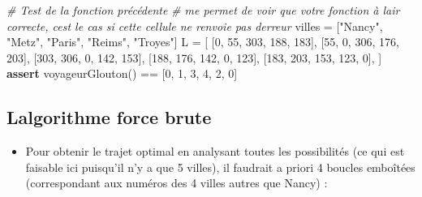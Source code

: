 \documentclass[
  paper=a4,
  ,captions=tableheading
]{scrartcl}
\newenvironment{Shaded}{}{}
\newcommand{\CommentTok}[1]{\textcolor[rgb]{0.38,0.63,0.69}{\textit{#1}}}
\newcommand{\ControlFlowTok}[1]{\textcolor[rgb]{0.00,0.44,0.13}{\textbf{#1}}}
\newcommand{\DecValTok}[1]{\textcolor[rgb]{0.25,0.63,0.44}{#1}}
\newcommand{\NormalTok}[1]{#1}
\newcommand{\OperatorTok}[1]{\textcolor[rgb]{0.40,0.40,0.40}{#1}}
\newcommand{\StringTok}[1]{\textcolor[rgb]{0.25,0.44,0.63}{#1}}
\providecommand{\tightlist}{%
  \setlength{\itemsep}{0pt}\setlength{\parskip}{0pt}}
\begin{document}
\begin{Shaded}
\begin{Highlighting}[]
\CommentTok{\# Test de la fonction précédente}
\CommentTok{\# me permet de voir que votre fonction à l\textquotesingle{}air correcte, c\textquotesingle{}est le cas si cette cellule ne renvoie pas d\textquotesingle{}erreur}
\NormalTok{villes }\OperatorTok{=}\NormalTok{ [}\StringTok{"Nancy"}\NormalTok{, }\StringTok{"Metz"}\NormalTok{, }\StringTok{"Paris"}\NormalTok{, }\StringTok{"Reims"}\NormalTok{, }\StringTok{"Troyes"}\NormalTok{]}
\NormalTok{L }\OperatorTok{=}\NormalTok{ [}
\NormalTok{    [}\DecValTok{0}\NormalTok{, }\DecValTok{55}\NormalTok{, }\DecValTok{303}\NormalTok{, }\DecValTok{188}\NormalTok{, }\DecValTok{183}\NormalTok{],}
\NormalTok{    [}\DecValTok{55}\NormalTok{, }\DecValTok{0}\NormalTok{, }\DecValTok{306}\NormalTok{, }\DecValTok{176}\NormalTok{, }\DecValTok{203}\NormalTok{],}
\NormalTok{    [}\DecValTok{303}\NormalTok{, }\DecValTok{306}\NormalTok{, }\DecValTok{0}\NormalTok{, }\DecValTok{142}\NormalTok{, }\DecValTok{153}\NormalTok{],}
\NormalTok{    [}\DecValTok{188}\NormalTok{, }\DecValTok{176}\NormalTok{, }\DecValTok{142}\NormalTok{, }\DecValTok{0}\NormalTok{, }\DecValTok{123}\NormalTok{],}
\NormalTok{    [}\DecValTok{183}\NormalTok{, }\DecValTok{203}\NormalTok{, }\DecValTok{153}\NormalTok{, }\DecValTok{123}\NormalTok{, }\DecValTok{0}\NormalTok{],}
\NormalTok{]}
\ControlFlowTok{assert}\NormalTok{ voyageurGlouton() }\OperatorTok{==}\NormalTok{ [}\DecValTok{0}\NormalTok{, }\DecValTok{1}\NormalTok{, }\DecValTok{3}\NormalTok{, }\DecValTok{4}\NormalTok{, }\DecValTok{2}\NormalTok{, }\DecValTok{0}\NormalTok{]}
\end{Highlighting}
\end{Shaded}

\hypertarget{lalgorithme-force-brute}{%
\subsection{L\textquotesingle algorithme force
brute}\label{lalgorithme-force-brute}}

\begin{itemize}
\tightlist
\item
  Pour obtenir le trajet optimal en analysant toutes les possibilités
  (ce qui est faisable ici puisqu'il n'y a que 5 villes), il faudrait a
  priori 4 boucles emboîtées (correspondant aux numéros des 4 villes
  autres que Nancy) :
\end{itemize}
\end{document}

